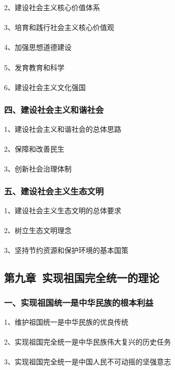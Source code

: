 \documentclass{ctexart}
\begin{document}
2、建设社会主义核心价值体系
\\\\

3、培育和践行社会主义核心价值观
\\\\

4、加强思想道德建设
\\\\

5、发育教育和科学
\\\\

6、建设社会主义文化强国

\subsubsection{四、建设社会主义和谐社会}
1、建设社会主义和谐社会的总体思路
\\\\

2、保障和改善民生
\\\\

3、创新社会治理体制

\subsubsection{五、建设社会主义生态文明}
1、建设社会主义生态文明的总体要求
\\\\

2、树立生态文明理念
\\\\

3、坚持节约资源和保护环境的基本国策

\subsection{第九章\ 实现祖国完全统一的理论}
\subsubsection{一、实现祖国统一是中华民族的根本利益}
1、维护祖国统一是中华民族的优良传统
\\\\

2、实现祖国完全统一是中华民族伟大复兴的历史任务
\\\\

3、实现祖国完全统一是中国人民不可动摇的坚强意志
\end{document}
